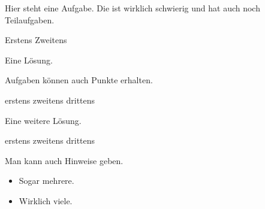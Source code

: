 \documentclass[a4paper]{scrartcl}
\begin{document}
    \begin{aufgabe}
        \setzeSymbol{\symZweiSprechblasen}
        Hier steht eine Aufgabe. Die ist wirklich schwierig und hat auch noch Teilaufgaben.
        \begin{teilaufgaben}
            \teilaufgabe Erstens
            \teilaufgabe Zweitens
        \end{teilaufgaben}
        \begin{loesung}
            Eine Lösung.
        \end{loesung}
        \begin{erwartungen}
        \end{erwartungen}
    \end{aufgabe}

    \begin{aufgabe}
        Aufgaben können auch Punkte erhalten.
        \begin{teilaufgaben}
            \teilaufgabe[5] erstens
            \teilaufgabe[10] zweitens
            \teilaufgabe[15] drittens
        \end{teilaufgaben}
        \begin{loesung}
            Eine weitere Lösung.
            \begin{teilaufgaben}
                \teilaufgabe erstens
                \teilaufgabe zweitens
                \teilaufgabe drittens
            \end{teilaufgaben}
        \end{loesung}
        \begin{bearbeitungshinweis}
            Man kann auch Hinweise geben.
            \begin{itemize}
                \item Sogar mehrere.
                \item Wirklich viele.
            \end{itemize}
        \end{bearbeitungshinweis}
    \end{aufgabe}
\end{document}
